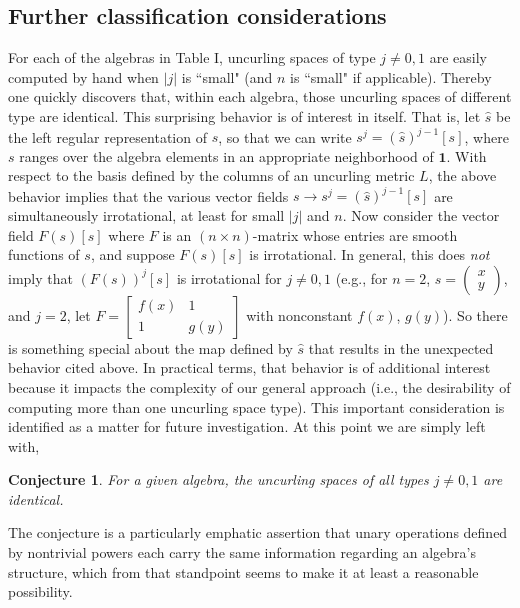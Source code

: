 \documentclass{amsart}
\numberwithin{equation}{section}
\newtheorem*{conjecture}{Conjecture}
\theoremstyle{definition}
\numberwithin{theorem}{section}
\begin{document}
\subsection{Further classification considerations} For each of the algebras in Table I, uncurling spaces of type $j\ne 0,1$ are easily computed by hand when  $|j|$ is ``small" (and $n$ is ``small" if applicable).  
Thereby one quickly discovers that, within each algebra, those uncurling spaces of different type are identical.  This surprising behavior is of interest in itself.  That is, let $\hat{s}$ be the left regular representation of $s$, so that we can write $s^j = (\hat{s})^{j-1}[s]$, where $s$ ranges over the algebra elements in an appropriate neighborhood of $\mathbf{1}$. With respect to the basis defined by the columns of an uncurling metric $L$, the above behavior implies that the various vector fields $s\rightarrow s^j = (\hat{s})^{j-1}[s]$ are simultaneously irrotational, at least for small $|j|$ and $n$.  Now consider the vector field $F(s)[s]$ where $F$ is an \mbox{$(n\times n)$-matrix} whose entries are smooth functions of $s$, and suppose $F(s)[s]$ is irrotational.  In general, this does {\it not} imply that $(F(s))^j[s]$ is irrotational for $j\ne 0,1$ (e.g., for \mbox{$n=2$}, $s=\left(\begin{array}{ccc}
 x   \\ 
y    
\end{array}\right)$, and $j=2$, let $F= \left[\begin{array}{ccc}
 f(x) & 1   \\ 
 1 & g(y)    
\end{array}\right]$ with nonconstant $f(x)$, $g(y)$).  So there is something special about the map defined by $\hat{s}$ that results in the unexpected behavior cited above. 
In practical terms, that behavior is of additional interest because it impacts the complexity of our general approach (i.e., the desirability of computing more than one uncurling space type).  This important consideration is identified as a matter for future investigation. At this point we are simply left with,
\begin{conjecture} For a given algebra, the uncurling spaces of all types $j\ne 0,1$ are identical. 
\end{conjecture}
\noindent The conjecture is a particularly emphatic assertion that unary operations defined by nontrivial powers each carry the same information regarding an algebra's structure, which from that standpoint seems to make it at least a reasonable possibility.  
 
\end{document}

